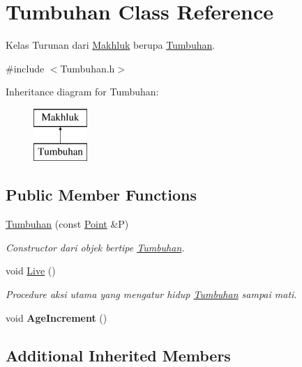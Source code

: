 \hypertarget{class_tumbuhan}{}\section{Tumbuhan Class Reference}
\label{class_tumbuhan}


Kelas Turunan dari \hyperlink{class_makhluk}{Makhluk} berupa \hyperlink{class_tumbuhan}{Tumbuhan}.  




{\ttfamily \#include $<$Tumbuhan.\+h$>$}

Inheritance diagram for Tumbuhan\+:\begin{figure}[H]
\begin{center}
\leavevmode
\includegraphics[height=2.000000cm]{class_tumbuhan}
\end{center}
\end{figure}
\subsection*{Public Member Functions}
\begin{DoxyCompactItemize}
\item 
\hyperlink{class_tumbuhan_a3095d94b67888eff7573c5e22620e550}{Tumbuhan} (const \hyperlink{class_point}{Point} \&P)
\begin{DoxyCompactList}\small\item\em Constructor dari objek bertipe \hyperlink{class_tumbuhan}{Tumbuhan}. \end{DoxyCompactList}\item 
void \hyperlink{class_tumbuhan_a18c42e3e111ea943eba9b4dee00ee96b}{Live} ()
\begin{DoxyCompactList}\small\item\em Procedure aksi utama yang mengatur hidup \hyperlink{class_tumbuhan}{Tumbuhan} sampai mati. \end{DoxyCompactList}\item 
void {\bfseries Age\+Increment} ()\hypertarget{class_tumbuhan_a99a110ee2eb38b98e9268565ba796373}{}\label{class_tumbuhan_a99a110ee2eb38b98e9268565ba796373}

\end{DoxyCompactItemize}
\subsection*{Additional Inherited Members}


